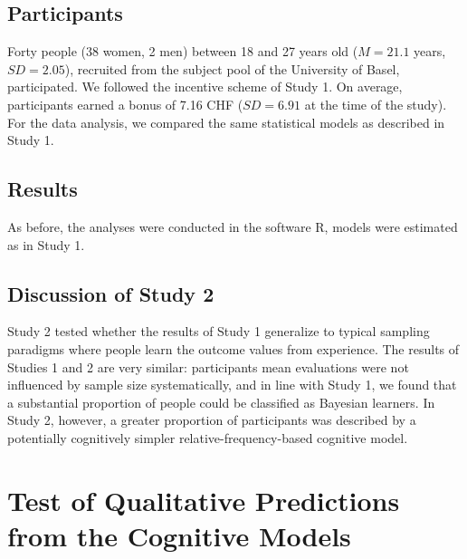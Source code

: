 \documentclass[a4paper, man, natbib, floatsintext]{apa6}
\begin{document}
\subsection{Participants}
Forty people (38 women, 2 men) between 18 and 27 years old ($M = 21.1$ years, $SD = 2.05$), recruited from the subject pool of the University of Basel, participated. We followed the incentive scheme of Study 1. On average, participants earned a bonus of 7.16 CHF ($SD = 6.91$ at the time of the study). For the data analysis, we compared the same statistical models as described in Study 1.

\subsection{Results}
As before, the analyses were conducted in the software R, models were estimated as in Study 1.


\clearpage

\subsection{Discussion of Study 2}
Study 2 tested whether the results of Study 1  generalize to typical sampling paradigms where people learn the outcome values from experience. The results of Studies 1 and 2 are very similar: participants mean evaluations were not influenced by sample size systematically, and in line with Study 1, we found that a substantial proportion of people could be classified as Bayesian learners. In Study 2, however, a greater proportion of participants was described by a potentially cognitively simpler relative-frequency-based cognitive model.

\clearpage %

\section{Test of Qualitative Predictions from the Cognitive Models}
\end{document}

